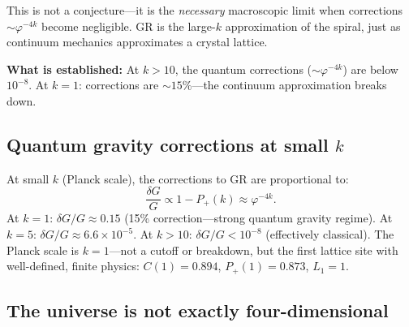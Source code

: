 \documentclass[12pt,a4paper]{article}
\begin{document}
This is not a conjecture---it is the \emph{necessary} macroscopic limit when corrections $\sim\varphi^{-4k}$ become negligible. GR is the large-$k$ approximation of the spiral, just as continuum mechanics approximates a crystal lattice.

\textbf{What is established:} At $k > 10$, the quantum corrections ($\sim \varphi^{-4k}$) are below $10^{-8}$. At $k = 1$: corrections are $\sim 15\%$---the continuum approximation breaks down.

\subsection{Quantum gravity corrections at small $k$}

At small $k$ (Planck scale), the corrections to GR are proportional to:
\begin{equation}
\frac{\delta G}{G} \propto 1 - P_+(k) \approx \varphi^{-4k}.
\end{equation}
At $k = 1$: $\delta G/G \approx 0.15$ (15\% correction---strong quantum gravity regime). At $k = 5$: $\delta G/G \approx 6.6 \times 10^{-5}$. At $k > 10$: $\delta G/G < 10^{-8}$ (effectively classical). The Planck scale is $k = 1$---not a cutoff or breakdown, but the first lattice site with well-defined, finite physics: $C(1) = 0.894$, $P_+(1) = 0.873$, $L_1 = 1$.

\subsection{The universe is not exactly four-dimensional}
\label{sec:dimension}
\end{document}
